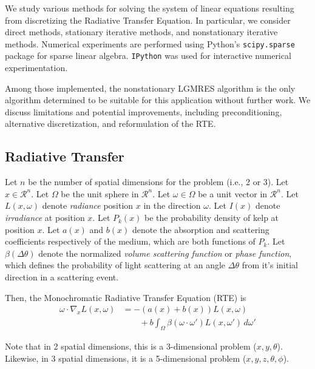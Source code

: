 \documentclass[10pt]{article}
\newcommand\RR{\mathcal{R}}
\begin{document}
\begin{multicols}{2}
We study various methods for solving the system of linear equations resulting from discretizing the Radiative Transfer Equation.
In particular, we consider direct methods, stationary iterative methods, and nonstationary iterative methods.
Numerical experiments are performed using Python's \texttt{scipy.sparse} \citep{jones_scipy:_2001} package for sparse linear algebra.
\texttt{IPython} \citep{perez_ipython:_2007} was used for interactive numerical experimentation.

Among those implemented, the nonstationary LGMRES \citep{baker_technique_2005} algorithm is the only algorithm determined to be suitable for this application without further work.
We discuss limitations and potential improvements, including preconditioning, alternative discretization, and reformulation of the RTE.

\subsection{Radiative Transfer}
Let $n$ be the number of spatial dimensions for the problem (i.e., 2 or 3).
Let $x \in \RR^n$.
Let $\Omega$ be the unit sphere in $\RR^n$.
Let $\omega \in \Omega$ be a unit vector in $\RR^n$.
Let $L(x,\omega)$ denote \textit{radiance} position $x$ in the direction $\omega$.
Let $I(x)$ denote \textit{irradiance} at position $x$.
Let $P_k(x)$ be the probability density of kelp at position $x$.
Let $a(x)$ and $b(x)$ denote the absorption and scattering coefficients respectively of the medium, which are both functions of $P_k$.
Let $\beta(\Delta\theta)$ denote the normalized \textit{volume scattering function} or \textit{phase function}, which defines the probability of light scattering at an angle $\Delta\theta$ from it's initial direction in a scattering event.

Then, the Monochromatic Radiative Transfer Equation (RTE) is
\begin{equation}
	\label{eq:rte}
	\begin{aligned}
		\omega \cdot \nabla_x L(x,\omega) &= -(a(x) + b(x)) L(x,\omega) \\
		&\qquad + b \int_\Omega \beta(\omega \cdot \omega') L(x,\omega')\, d\omega'
	\end{aligned}
\end{equation}

Note that in 2 spatial dimensions, this is a 3-dimensional problem ($x,y,\theta$).
Likewise, in 3 spatial dimensions, it is a 5-dimensional problem ($x,y,z,\theta,\phi$).


\end{multicols}
\end{document}
